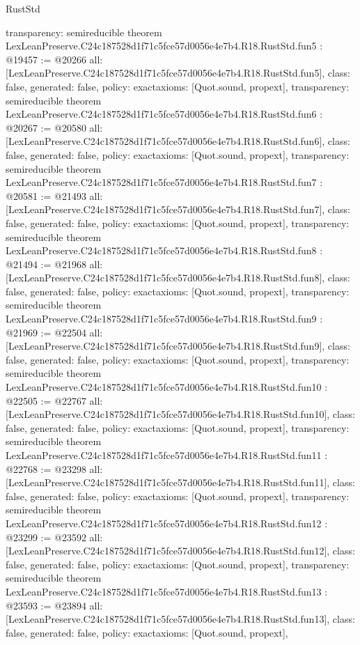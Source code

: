 \begin{lexlean}{RustStd}
\begin{coremodule}
{  transparency: semireducible
}
theorem LexLeanPreserve.C24c187528d1f71c5fce57d0056e4e7b4.R18.RustStd.fun5 : @19457 := @20266 {
  all: [LexLeanPreserve.C24c187528d1f71c5fce57d0056e4e7b4.R18.RustStd.fun5],
  class: false,
  generated: false,
  policy: exact{axioms: [Quot.sound, propext]},
  transparency: semireducible
}
theorem LexLeanPreserve.C24c187528d1f71c5fce57d0056e4e7b4.R18.RustStd.fun6 : @20267 := @20580 {
  all: [LexLeanPreserve.C24c187528d1f71c5fce57d0056e4e7b4.R18.RustStd.fun6],
  class: false,
  generated: false,
  policy: exact{axioms: [Quot.sound, propext]},
  transparency: semireducible
}
theorem LexLeanPreserve.C24c187528d1f71c5fce57d0056e4e7b4.R18.RustStd.fun7 : @20581 := @21493 {
  all: [LexLeanPreserve.C24c187528d1f71c5fce57d0056e4e7b4.R18.RustStd.fun7],
  class: false,
  generated: false,
  policy: exact{axioms: [Quot.sound, propext]},
  transparency: semireducible
}
theorem LexLeanPreserve.C24c187528d1f71c5fce57d0056e4e7b4.R18.RustStd.fun8 : @21494 := @21968 {
  all: [LexLeanPreserve.C24c187528d1f71c5fce57d0056e4e7b4.R18.RustStd.fun8],
  class: false,
  generated: false,
  policy: exact{axioms: [Quot.sound, propext]},
  transparency: semireducible
}
theorem LexLeanPreserve.C24c187528d1f71c5fce57d0056e4e7b4.R18.RustStd.fun9 : @21969 := @22504 {
  all: [LexLeanPreserve.C24c187528d1f71c5fce57d0056e4e7b4.R18.RustStd.fun9],
  class: false,
  generated: false,
  policy: exact{axioms: [Quot.sound, propext]},
  transparency: semireducible
}
theorem LexLeanPreserve.C24c187528d1f71c5fce57d0056e4e7b4.R18.RustStd.fun10 : @22505 := @22767 {
  all: [LexLeanPreserve.C24c187528d1f71c5fce57d0056e4e7b4.R18.RustStd.fun10],
  class: false,
  generated: false,
  policy: exact{axioms: [Quot.sound, propext]},
  transparency: semireducible
}
theorem LexLeanPreserve.C24c187528d1f71c5fce57d0056e4e7b4.R18.RustStd.fun11 : @22768 := @23298 {
  all: [LexLeanPreserve.C24c187528d1f71c5fce57d0056e4e7b4.R18.RustStd.fun11],
  class: false,
  generated: false,
  policy: exact{axioms: [Quot.sound, propext]},
  transparency: semireducible
}
theorem LexLeanPreserve.C24c187528d1f71c5fce57d0056e4e7b4.R18.RustStd.fun12 : @23299 := @23592 {
  all: [LexLeanPreserve.C24c187528d1f71c5fce57d0056e4e7b4.R18.RustStd.fun12],
  class: false,
  generated: false,
  policy: exact{axioms: [Quot.sound, propext]},
  transparency: semireducible
}
theorem LexLeanPreserve.C24c187528d1f71c5fce57d0056e4e7b4.R18.RustStd.fun13 : @23593 := @23894 {
  all: [LexLeanPreserve.C24c187528d1f71c5fce57d0056e4e7b4.R18.RustStd.fun13],
  class: false,
  generated: false,
  policy: exact{axioms: [Quot.sound, propext]},
}
\end{coremodule}
\end{lexlean}
